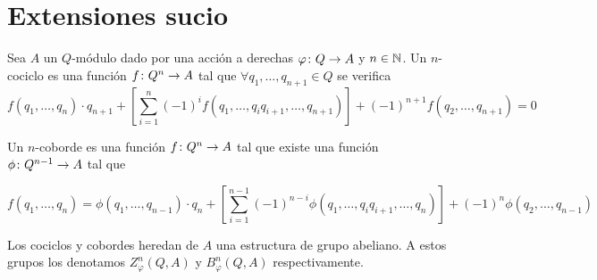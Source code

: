 
\chapter{Extensiones sucio}




\begin{definicion}
	Sea $A$ un $Q$-módulo dado por una acción a derechas $\varphi\colon Q\to A$ y $n\in\mathbb{N}$. 
	Un $n$-cociclo es una función $f\colon Q^n\to A$ tal que $\forall q_1,\hdots,q_{n+1}\in Q$ se verifica
	\begin{equation*}
	 f(q_1,\hdots,q_n)\cdot q_{n+1} + \left[\sum\limits_{i=1}^{n}(-1)^i f(q_1,\hdots,q_iq_{i+1},\hdots,q_{n+1}) \right] + (-1)^{n+1}f(q_2,\hdots,q_{n+1}) = 0
	\end{equation*}
	
	Un $n$-coborde es una función $f\colon Q^n\to A$ tal que existe una función $\phi\colon Q^{n-1}\to A$ tal que
	
	\begin{equation*}
		f(q_1,\hdots, q_n) = \phi(q_1,\hdots,q_{n-1})\cdot q_n + \left[\sum\limits_{i=1}^{n-1}(-1)^{n-i} \phi(q_1,\hdots,q_iq_{i+1},\hdots,q_n) \right] + (-1)^n\phi(q_2,\hdots,q_{n-1})
	\end{equation*} 
	
	Los cociclos y cobordes heredan de $A$ una estructura de grupo abeliano. A estos grupos los denotamos $Z^n_\varphi(Q,A)$ y $B^n_\varphi(Q,A)$ respectivamente.
\end{definicion}

